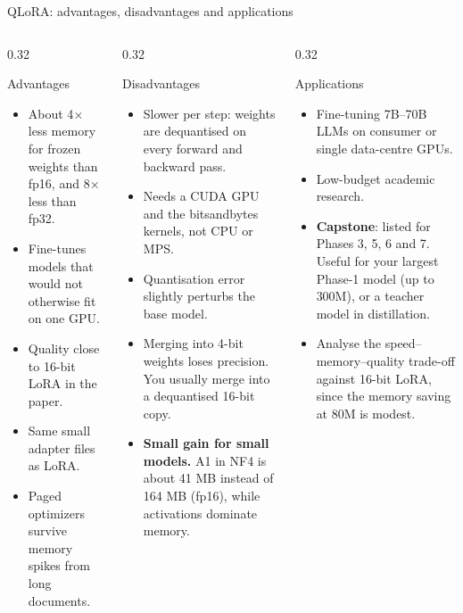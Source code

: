 \documentclass[aspectratio=169,11pt]{beamer}
\begin{document}
\begin{frame}{QLoRA: advantages, disadvantages and applications}
  \begin{columns}[T]
    \begin{column}{0.32\textwidth}
      \begin{exampleblock}{Advantages}
        \scriptsize
        \begin{itemize}
          \item About 4$\times$ less memory for frozen weights than fp16, and 8$\times$ less than fp32.
          \item Fine-tunes models that would not otherwise fit on one GPU.
          \item Quality close to 16-bit LoRA in the paper.
          \item Same small adapter files as LoRA.
          \item Paged optimizers survive memory spikes from long documents.
        \end{itemize}
      \end{exampleblock}
    \end{column}
    \begin{column}{0.32\textwidth}
      \begin{alertblock}{Disadvantages}
        \scriptsize
        \begin{itemize}
          \item Slower per step: weights are dequantised on every forward and backward pass.
          \item Needs a CUDA GPU and the bitsandbytes kernels, not CPU or MPS.
          \item Quantisation error slightly perturbs the base model.
          \item Merging into 4-bit weights loses precision. You usually merge into a dequantised 16-bit copy.
          \item \textbf{Small gain for small models.} A1 in NF4 is about 41 MB instead of 164 MB (fp16), while activations dominate memory.
        \end{itemize}
      \end{alertblock}
    \end{column}
    \begin{column}{0.32\textwidth}
      \begin{block}{Applications}
        \scriptsize
        \begin{itemize}
          \item Fine-tuning 7B--70B LLMs on consumer or single data-centre GPUs.
          \item Low-budget academic research.
          \item \textbf{Capstone}: listed for Phases 3, 5, 6 and 7. Useful for your largest Phase-1 model (up to 300M), or a teacher model in distillation.
          \item Analyse the speed--memory--quality trade-off against 16-bit LoRA, since the memory saving at 80M is modest.
        \end{itemize}
      \end{block}
    \end{column}
  \end{columns}
\end{frame}
\end{document}
